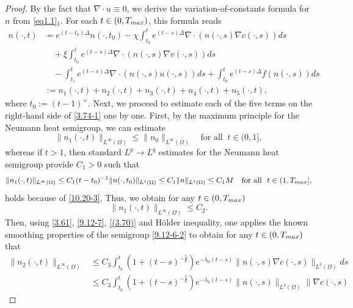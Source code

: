 \documentclass[10pt,a4paper]{amsart}
\numberwithin{equation}{section}
\begin{document}
\begin{proof} By the fact that \( \nabla \cdot u \equiv 0 \), we derive the 
variation-of-constants formula for $n$ from \eqref{eq1.1}$_1$. 
For each \( t \in (0,T_{\rm max}) \), this formula reads
\begin{equation}\label{3.74-1}
\begin{aligned}
n(\cdot, t) 
&= e^{(t-t_0)\Delta} n(\cdot,t_0) -\chi \int_{t_0}^t  e^{(t - s)\Delta} \nabla 
 \cdot (n(\cdot, s) \nabla c(\cdot, s)) ds \\
&\quad +\xi \int_{t_0}^t e^{(t - s)\Delta} \nabla \cdot (n(\cdot, s) 
 \nabla v(\cdot, s)) ds \\
&\quad - \int_{t_1}^t  e^{(t - s)\Delta} \nabla \cdot (n(\cdot, s) u(\cdot, s))  ds
+ \int_{t_0}^te^{(t - s)\Delta} f(n(\cdot, s))ds\\
&:= n_1(\cdot,t) + n_2(\cdot,t) + n_3(\cdot,t)+ n_4(\cdot,t)+ n_5(\cdot,t),
\end{aligned}
\end{equation}
where $t_0 := (t-1)^+$. Next, we proceed to estimate each of the five terms on the 
right-hand side of \eqref{3.74-1} one by one. First, by the maximum principle for 
the Neumann heat semigroup, we can estimate
\[
\|n_1(\cdot,t)\|_{L^\infty(\Omega)} \leq \|n_0\|_{L^\infty(\Omega)} \quad 
\text{for\ all }\ t \in (0,1],
\]
whereas if $t > 1$, then standard $L^p \to L^q$ estimates for the Neumann heat 
semigroup provide $C_1> 0$ such that
\[
\|n_1(\cdot,t)\|_{L^\infty(\Omega)} \leq C_1 (t - t_0)^{-1} \|n(\cdot,t_0)
\|_{L^1(\Omega)}\leq C_1 \|n\|_{L^1(\Omega)} \leq C_1M \quad 
\text{for\ all }\ t \in (1,T_{\rm max}],
\]
holds because of \eqref{10.20-3}. Thus, we obtain for any $t\in (0,T_{\rm max})$
\begin{equation}\label{3.75}
\|n_1(\cdot,t)\|_{L^\infty(\Omega)} \leq C_{2}.
\end{equation}
Then, using \eqref{3.61}, \eqref{9.12-7}, \eqref{(3.70)} and H\"{o}lder inequality, 
one applies the known smoothing properties of the semigroup
\eqref{9.12-6-2} to obtain for any $t\in (0,T_{\rm max})$ that
\begin{equation}
\begin{aligned}\label{3.76}
\| n_2(\cdot,t) \|_{L^\infty(\Omega)}
&\leq C_{3} \int_{t_0}^t ( 1 + (t - s)^{-\frac{5}{6}} ) 
 e^{-\lambda_9 (t-s)} \| n(\cdot, s) \nabla c(\cdot, s) \|_{L^{3}(\Omega)} ds \\
&\leq C_{3} \int_{t_0}^t ( 1 + (t - s)^{-\frac{5}{6}} ) 
 e^{-\lambda_9 (t-s)} \| n(\cdot, s) \|_{L^3(\Omega)} \| \nabla c(\cdot, s) 

\end{aligned}
\end{equation}
\end{proof}
\end{document}
